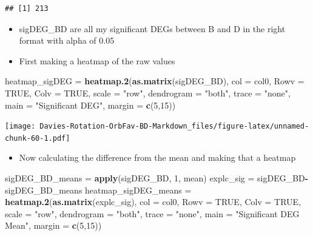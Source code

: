 \documentclass[
]{article}
\newenvironment{Shaded}{\begin{snugshade}}{\end{snugshade}}
\newcommand{\DataTypeTok}[1]{\textcolor[rgb]{0.13,0.29,0.53}{#1}}
\newcommand{\DecValTok}[1]{\textcolor[rgb]{0.00,0.00,0.81}{#1}}
\newcommand{\KeywordTok}[1]{\textcolor[rgb]{0.13,0.29,0.53}{\textbf{#1}}}
\newcommand{\NormalTok}[1]{#1}
\newcommand{\OperatorTok}[1]{\textcolor[rgb]{0.81,0.36,0.00}{\textbf{#1}}}
\newcommand{\OtherTok}[1]{\textcolor[rgb]{0.56,0.35,0.01}{#1}}
\newcommand{\StringTok}[1]{\textcolor[rgb]{0.31,0.60,0.02}{#1}}
\providecommand{\tightlist}{%
  \setlength{\itemsep}{0pt}\setlength{\parskip}{0pt}}
\begin{document}
\begin{verbatim}
## [1] 213
\end{verbatim}

\begin{itemize}
\tightlist
\item
  sigDEG\_BD are all my significant DEGs between B and D in the right
  format with alpha of 0.05
\item
  First making a heatmap of the raw values
\end{itemize}

\begin{Shaded}
\begin{Highlighting}[]
\NormalTok{heatmap_sigDEG =}\StringTok{ }\KeywordTok{heatmap.2}\NormalTok{(}\KeywordTok{as.matrix}\NormalTok{(sigDEG_BD), }\DataTypeTok{col =}\NormalTok{ col0, }\DataTypeTok{Rowv =} \OtherTok{TRUE}\NormalTok{, }\DataTypeTok{Colv =} \OtherTok{TRUE}\NormalTok{, }\DataTypeTok{scale =} \StringTok{"row"}\NormalTok{,}
                           \DataTypeTok{dendrogram =} \StringTok{"both"}\NormalTok{,}
                           \DataTypeTok{trace =} \StringTok{"none"}\NormalTok{,}
                           \DataTypeTok{main =} \StringTok{"Significant DEG"}\NormalTok{,}
                           \DataTypeTok{margin =} \KeywordTok{c}\NormalTok{(}\DecValTok{5}\NormalTok{,}\DecValTok{15}\NormalTok{))}
\end{Highlighting}
\end{Shaded}

\texttt{[image: Davies-Rotation-OrbFav-BD-Markdown\_files/figure-latex/unnamed-chunk-60-1.pdf]}

\begin{itemize}
\tightlist
\item
  Now calculating the difference from the mean and making that a heatmap
\end{itemize}

\begin{Shaded}
\begin{Highlighting}[]
\NormalTok{sigDEG_BD_means =}\StringTok{ }\KeywordTok{apply}\NormalTok{(sigDEG_BD, }\DecValTok{1}\NormalTok{, mean)}
\NormalTok{explc_sig =}\StringTok{ }\NormalTok{sigDEG_BD}\OperatorTok{-}\NormalTok{sigDEG_BD_means}
\NormalTok{heatmap_sigDEG_means =}\StringTok{ }\KeywordTok{heatmap.2}\NormalTok{(}\KeywordTok{as.matrix}\NormalTok{(explc_sig), }\DataTypeTok{col =}\NormalTok{ col0, }\DataTypeTok{Rowv =} \OtherTok{TRUE}\NormalTok{, }\DataTypeTok{Colv =} \OtherTok{TRUE}\NormalTok{, }\DataTypeTok{scale =} \StringTok{"row"}\NormalTok{,}
                           \DataTypeTok{dendrogram =} \StringTok{"both"}\NormalTok{,}
                           \DataTypeTok{trace =} \StringTok{"none"}\NormalTok{,}
                           \DataTypeTok{main =} \StringTok{"Significant DEG Mean"}\NormalTok{,}
                           \DataTypeTok{margin =} \KeywordTok{c}\NormalTok{(}\DecValTok{5}\NormalTok{,}\DecValTok{15}\NormalTok{))}
\end{Highlighting}
\end{Shaded}
\end{document}
